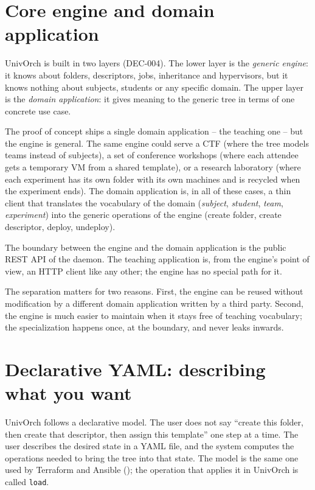 \section{Core engine and domain application}
\label{sec:dos-capas}

UnivOrch is built in two layers (DEC-004). The lower layer is the
\emph{generic engine}: it knows about folders, descriptors, jobs,
inheritance and hypervisors, but it knows nothing about subjects,
students or any specific domain. The upper layer is the
\emph{domain application}: it gives meaning to the generic tree in
terms of one concrete use case.

The proof of concept ships a single domain application -- the
teaching one -- but the engine is general. The same engine could
serve a CTF (where the tree models teams instead of subjects), a
set of conference workshops (where each attendee gets a temporary
VM from a shared template), or a research laboratory (where each
experiment has its own folder with its own machines and is
recycled when the experiment ends). The domain application is, in
all of these cases, a thin client that translates the vocabulary of
the domain (\emph{subject}, \emph{student}, \emph{team},
\emph{experiment}) into the generic operations of the engine
(create folder, create descriptor, deploy, undeploy).

The boundary between the engine and the domain application is the
public REST API of the daemon. The teaching application is, from
the engine's point of view, an HTTP client like any other; the
engine has no special path for it.

The separation matters for two reasons. First, the engine can be
reused without modification by a different domain application
written by a third party. Second, the engine is much easier to
maintain when it stays free of teaching vocabulary; the
specialization happens once, at the boundary, and never leaks
inwards.

\section{Declarative YAML: describing what you want}
\label{sec:declarativo}

UnivOrch follows a declarative model. The user does not say
``create this folder, then create that descriptor, then assign this
template'' one step at a time. The user describes the desired
state in a YAML file, and the system computes the operations needed
to bring the tree into that state. The model is the same one used by
Terraform and Ansible (); the operation that
applies it in UnivOrch is called \texttt{load}.

